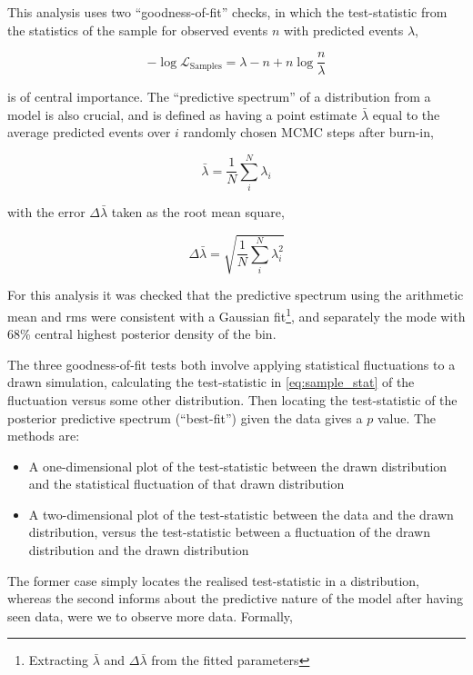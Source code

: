 This analysis uses two ``goodness-of-fit'' checks, in which the test-statistic from the statistics of the sample for observed events $n$ with predicted events $\lambda$,

\begin{equation}
	-\log\mathcal{L}_\text{Samples} = \lambda-n+n\log\frac{n}{\lambda}
	\label{eq:sample_stat}
\end{equation}

is of central importance. The ``predictive spectrum'' of a distribution from a model is also crucial, and is defined as having a point estimate $\bar{\lambda}$ equal to the average predicted events over $i$ randomly chosen MCMC steps after burn-in,

\begin{equation}
	\bar{\lambda} = \frac{1}{N} \sum^{N}_i \lambda_i
\end{equation}

with the error $\Delta \bar{\lambda}$ taken as the root mean square,

\begin{equation}
	\Delta \bar{\lambda} = \sqrt{\frac{1}{N} \sum^{N}_i \lambda^2_i}
\end{equation}

For this analysis it was checked that the predictive spectrum using the arithmetic mean and rms were consistent with a Gaussian fit\footnote{Extracting $\bar{\lambda}$ and $\Delta \bar{\lambda}$ from the fitted parameters}, and separately the mode with 68\% central highest posterior density of the bin.

The three goodness-of-fit tests both involve applying statistical fluctuations to a drawn simulation, calculating the test-statistic in \autoref{eq:sample_stat} of the fluctuation versus some other distribution. Then locating the test-statistic of the posterior predictive spectrum (``best-fit'') given the data gives a $p$ value. The methods are:

\begin{itemize} 
	\item A one-dimensional plot of the test-statistic between the drawn distribution and the statistical fluctuation of that drawn distribution
	\item A two-dimensional plot of the test-statistic between the data and the drawn distribution, versus the test-statistic between a fluctuation of the drawn distribution and the drawn distribution
\end{itemize}
The former case simply locates the realised test-statistic in a distribution, whereas the second informs about the predictive nature of the model after having seen data, were we to observe more data. Formally,

